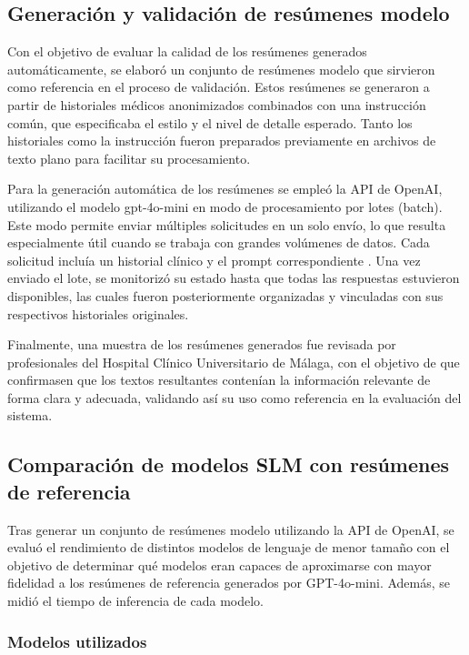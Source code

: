 \documentclass[../main.tex]{subfiles}
\begin{document}
	
	\subsection{Generación y validación de resúmenes modelo}
	
	Con el objetivo de evaluar la calidad de los resúmenes generados automáticamente, se elaboró un conjunto de resúmenes modelo que sirvieron como referencia en el proceso de validación. Estos resúmenes se generaron a partir de historiales médicos anonimizados combinados con una instrucción común, que especificaba el estilo y el nivel de detalle esperado. Tanto los historiales como la instrucción fueron preparados previamente en archivos de texto plano para facilitar su procesamiento.
	
	Para la generación automática de los resúmenes se empleó la API de OpenAI, utilizando el modelo gpt-4o-mini en modo de procesamiento por lotes (batch). Este modo permite enviar múltiples solicitudes en un solo envío, lo que resulta especialmente útil cuando se trabaja con grandes volúmenes de datos. Cada solicitud incluía un historial clínico y el prompt correspondiente \parencite{openaiBatch}. Una vez enviado el lote, se monitorizó su estado hasta que todas las respuestas estuvieron disponibles, las cuales fueron posteriormente organizadas y vinculadas con sus respectivos historiales originales.
	
	Finalmente, una muestra de los resúmenes generados fue revisada por profesionales del Hospital Clínico Universitario de Málaga, con el objetivo de que confirmasen que los textos resultantes contenían la información relevante de forma clara y adecuada, validando así su uso como referencia en la evaluación del sistema.
	
	
	\subsection{Comparación de modelos SLM con resúmenes de referencia}
	
	Tras generar un conjunto de resúmenes modelo utilizando la API de OpenAI, se evaluó el rendimiento de distintos modelos de lenguaje de menor tamaño con el objetivo de determinar qué modelos eran capaces de aproximarse con mayor fidelidad a los resúmenes de referencia generados por GPT-4o-mini. Además, se midió el tiempo de inferencia de cada modelo.
	
	\subsubsection{Modelos utilizados}
	
\end{document}
